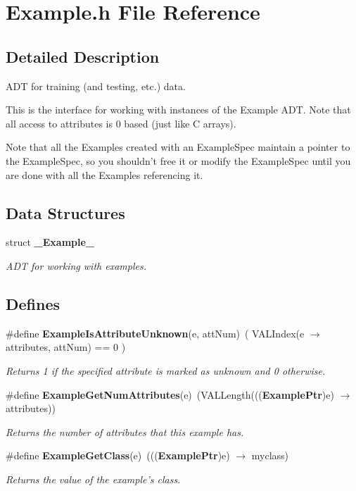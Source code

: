\section{Example.h File Reference}
\label{Example_8h}


\subsection{Detailed Description}
ADT for training (and testing, etc.) data. 

This is the interface for working with instances of the Example ADT. Note that all access to attributes is 0 based (just like C arrays).

Note that all the Examples created with an Example\-Spec maintain a pointer to the Example\-Spec, so you shouldn't free it or modify the Example\-Spec until you are done with all the Examples referencing it.

\subsection*{Data Structures}
\begin{CompactItemize}
\item 
struct {\bf \_\-Example\_\-}
\begin{CompactList}\small\item\em ADT for working with examples. \item\end{CompactList}\end{CompactItemize}
\subsection*{Defines}
\begin{CompactItemize}
\item 
\#define {\bf Example\-Is\-Attribute\-Unknown}(e, att\-Num)\ ( VALIndex(e $\rightarrow$ attributes, att\-Num) == 0 )
\begin{CompactList}\small\item\em Returns 1 if the specified attribute is marked as unknown and 0 otherwise. \item\end{CompactList}\item 
\#define {\bf Example\-Get\-Num\-Attributes}(e)\ (VALLength((({\bf Example\-Ptr})e) $\rightarrow$ attributes))
\begin{CompactList}\small\item\em Returns the number of attributes that this example has. \item\end{CompactList}\item 
\#define {\bf Example\-Get\-Class}(e)\ ((({\bf Example\-Ptr})e) $\rightarrow$ myclass)
\begin{CompactList}\small\item\em Returns the value of the example's class. \item\end{CompactList}\end{CompactItemize}
